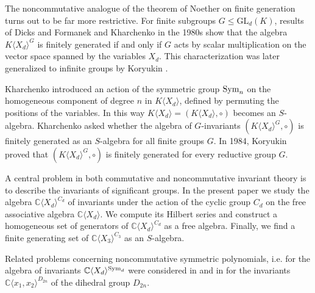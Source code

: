 \documentclass{amsart}
\theoremstyle{definition}
\newcommand{\C}{{\mathbb{C}}}
\newcommand{\KXd}{K\langle X_d\rangle}
\begin{document}
The noncommutative analogue of the theorem of Noether on finite generation turns out to be far more restrictive.
For finite subgroups $G \leq \text{GL}_d(K)$, results of Dicks and Formanek \cite{DiFo} and Kharchenko \cite{Kh2} in the 1980s show that the algebra $K\langle X_d\rangle^G$ is finitely generated
if and only if $G$ acts by scalar multiplication on the vector space spanned by the variables $X_d$. This characterization was later generalized to infinite groups by Koryukin \cite{Kor}.

Kharchenko \cite{Kh2} %
introduced an action of the symmetric group $\text{\rm Sym}_n$ on the  homogeneous component of degree $n$ in $\KXd$, defined by permuting the positions of the variables.
In this way $K\langle X_d\rangle=(\KXd,\circ)$ becomes an $S$-algebra. Kharchenko asked whether the algebra of $G$-invariants $(K\langle X_d\rangle^G,\circ)$ is finitely generated as an $S$-algebra
for all finite groups $G$. In 1984, Koryukin \cite{Kor} proved that $(K\langle X_d\rangle^G,\circ)$ is finitely generated for every reductive group $G$.

A central problem in both commutative and noncommutative invariant theory is to describe the invariants of significant groups.
In the present paper we study the algebra ${\mathbb C}\langle X_d\rangle^{C_d}$ of invariants under the action of the cyclic group $C_d$ on the free associative algebra ${\mathbb C}\langle X_d\rangle$.
We compute its Hilbert series and construct a homogeneous set of
generators of ${\mathbb C}\langle X_d\rangle^{C_d}$ as a free algebra. Finally, we find a finite generating set of ${\mathbb C}\langle X_3\rangle^{C_3}$ as an $S$-algebra.

Related problems concerning noncommutative symmetric polynomials, i.e. for the algebra of invariants $\C\langle X_d \rangle^{\text{\rm Sym}_d}$ were considered in \cite{BDDK}
and in \cite{BDF} for the invariants ${\mathbb C}\langle x_1,x_2\rangle^{D_{2n}}$ of the dihedral group $D_{2n}$.

\end{document}
